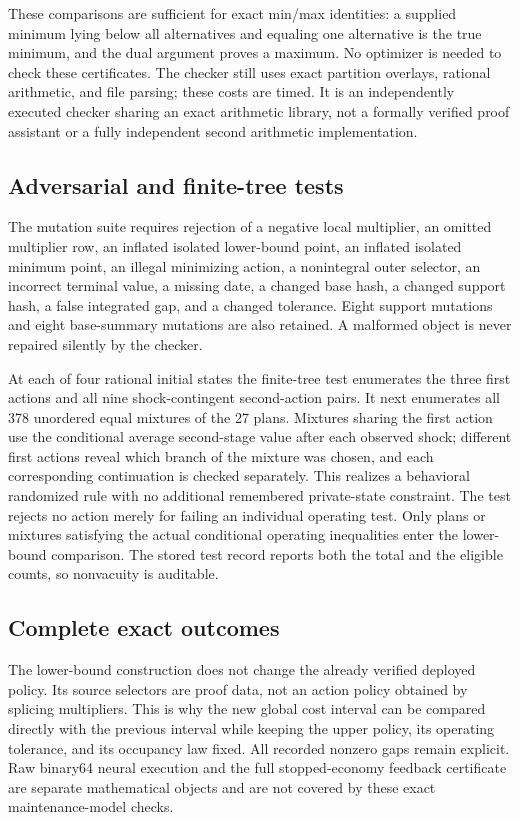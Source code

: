 These comparisons are sufficient for exact min/max identities: a supplied minimum lying below all alternatives and equaling one alternative is the true minimum, and the dual argument proves a maximum. No optimizer is needed to check these certificates. The checker still uses exact partition overlays, rational arithmetic, and file parsing; these costs are timed. It is an independently executed checker sharing an exact arithmetic library, not a formally verified proof assistant or a fully independent second arithmetic implementation.

\subsection{Adversarial and finite-tree tests}
The mutation suite requires rejection of a negative local multiplier, an omitted multiplier row, an inflated isolated lower-bound point, an inflated isolated minimum point, an illegal minimizing action, a nonintegral outer selector, an incorrect terminal value, a missing date, a changed base hash, a changed support hash, a false integrated gap, and a changed tolerance. Eight support mutations and eight base-summary mutations are also retained. A malformed object is never repaired silently by the checker.

At each of four rational initial states the finite-tree test enumerates the three first actions and all nine shock-contingent second-action pairs. It next enumerates all 378 unordered equal mixtures of the 27 plans. Mixtures sharing the first action use the conditional average second-stage value after each observed shock; different first actions reveal which branch of the mixture was chosen, and each corresponding continuation is checked separately. This realizes a behavioral randomized rule with no additional remembered private-state constraint. The test rejects no action merely for failing an individual operating test. Only plans or mixtures satisfying the actual conditional operating inequalities enter the lower-bound comparison. The stored test record reports both the total and the eligible counts, so nonvacuity is auditable.

\subsection{Complete exact outcomes}


The lower-bound construction does not change the already verified deployed policy. Its source selectors are proof data, not an action policy obtained by splicing multipliers. This is why the new global cost interval can be compared directly with the previous interval while keeping the upper policy, its operating tolerance, and its occupancy law fixed. All recorded nonzero gaps remain explicit. Raw binary64 neural execution and the full stopped-economy feedback certificate are separate mathematical objects and are not covered by these exact maintenance-model checks.
